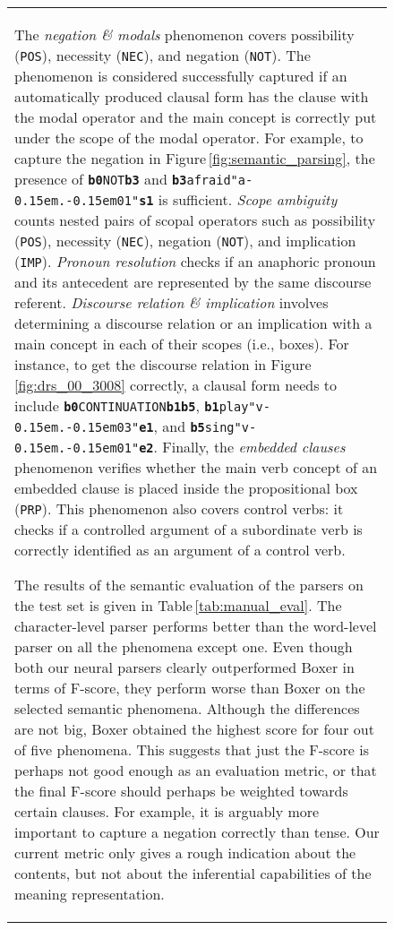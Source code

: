 \documentclass[11pt,a4paper]{article}
\newcommand{\drgvar}[1]{\textbf{#1}}
\newcommand{\posn}[2]{#1\kern-0.15em.\kern-0.15em#2}
\begin{document}
\begin{figure*}[!t]
\begin{subfigure}{50mm}
{{\begin{tabular}[t]{@{}l@{}}
{The \textit{negation \& modals} phenomenon covers possibility (\texttt{POS}), necessity (\texttt{NEC}), and negation (\texttt{NOT}).
The phenomenon is considered successfully captured if an automatically produced clausal form has the clause with the modal operator and the main concept is correctly put under the scope of the modal operator. 
For example, to capture the negation in Figure\,\ref{fig:semantic_parsing}, the presence of {\small \texttt{\drgvar{b0}\;NOT\;\drgvar{b3}}} and {\small\texttt{\drgvar{b3}\;afraid\;"\posn{a}{01}"\;\drgvar{s1}}} is sufficient.   
\textit{Scope ambiguity} counts nested pairs of scopal operators such as possibility (\texttt{POS}), necessity (\texttt{NEC}), negation (\texttt{NOT}), and implication (\texttt{IMP}).
\textit{Pronoun resolution} checks if an anaphoric pronoun and its antecedent are represented by the same discourse referent.   
\textit{Discourse relation \& implication} involves determining a discourse relation or an implication with a main concept in each of their scopes (i.e., boxes).
For instance, to get the discourse relation in Figure\,\ref{fig:drs_00_3008} correctly, a clausal form needs to include 
{\small\texttt{\drgvar{b0}\;CONTINUATION\;\drgvar{b1}\;\drgvar{b5}}}, {\small\texttt{\drgvar{b1}\;play\;"\posn{v}{03}"\;\drgvar{e1}}}, 
and {\small\texttt{\drgvar{b5}\;sing\;"\posn{v}{01}"\;\drgvar{e2}}}.
Finally, the \textit{embedded clauses} phenomenon verifies whether the main verb concept of an embedded clause is placed inside the propositional box (\texttt{PRP}).
This phenomenon also covers control verbs: it checks if a controlled argument of a subordinate verb is correctly identified as an argument of a control verb.

The results of the semantic evaluation of the parsers on the test set is given in Table\,\ref{tab:manual_eval}. 
The character-level parser performs better than the word-level parser on all the phenomena except 
one.
Even though both our neural parsers clearly outperformed Boxer in terms of F-score, they perform worse than Boxer on the selected semantic phenomena. Although the differences are not big, Boxer obtained the highest score for four out of five phenomena.
This suggests that just the F-score is perhaps not good enough as an evaluation metric, or that the final F-score should perhaps be weighted towards certain clauses. For example, it is arguably more important to capture a negation correctly than tense. 
Our current metric only gives a rough indication about the contents, but not about the inferential capabilities of the meaning representation.

}
\end{tabular}}}
\end{subfigure}
\end{figure*}
\end{document}

